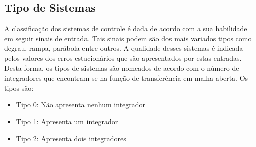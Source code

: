 \subsection{Tipo de Sistemas}
A classificação dos sistemas de controle é dada de acordo com a sua habilidade em seguir sinais de entrada. Tais sinais podem são dos mais variados tipos como degrau, rampa, parábola entre outros. A qualidade desses sistemas é indicada pelos valores dos erros estacionários que são apresentados por estas entradas.
Desta forma, os tipos de sistemas são nomeados de acordo com o número de integradores que encontram-se na função de transferência em malha aberta.
Os tipos são:
\begin{itemize}
    \item Tipo 0: Não apresenta nenhum integrador
    \item Tipo 1: Apresenta um integrador
    \item Tipo 2: Apresenta dois integradores
\end{itemize}

